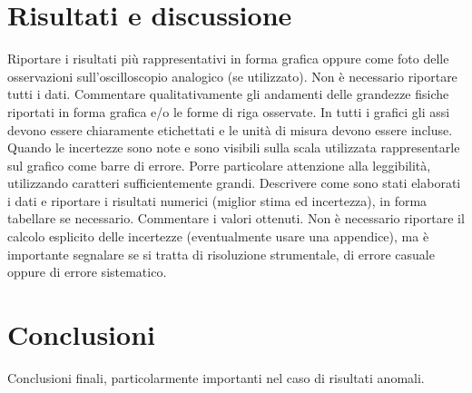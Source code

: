 \documentclass[12pt]{article}
\begin{document}
\section*{Risultati e discussione}
Riportare i risultati più rappresentativi in forma grafica oppure come foto delle osservazioni
sull'oscilloscopio analogico (se utilizzato). Non è necessario riportare tutti i dati. Commentare
qualitativamente gli andamenti delle grandezze fisiche riportati in forma grafica e/o le forme di riga
osservate. In tutti i grafici gli assi devono essere chiaramente etichettati e le unità di misura devono
essere incluse. Quando le incertezze sono note e sono visibili sulla scala utilizzata rappresentarle sul
grafico come barre di errore. Porre particolare attenzione alla leggibilità, utilizzando caratteri
sufficientemente grandi.
Descrivere come sono stati elaborati i dati e riportare i risultati numerici (miglior stima ed
incertezza), in forma tabellare se necessario. Commentare i valori ottenuti. Non è necessario
riportare il calcolo esplicito delle incertezze (eventualmente usare una appendice), ma è importante
segnalare se si tratta di risoluzione strumentale, di errore casuale oppure di errore sistematico.
\section*{Conclusioni}
Conclusioni finali, particolarmente importanti nel caso di risultati anomali.
\end{document}
